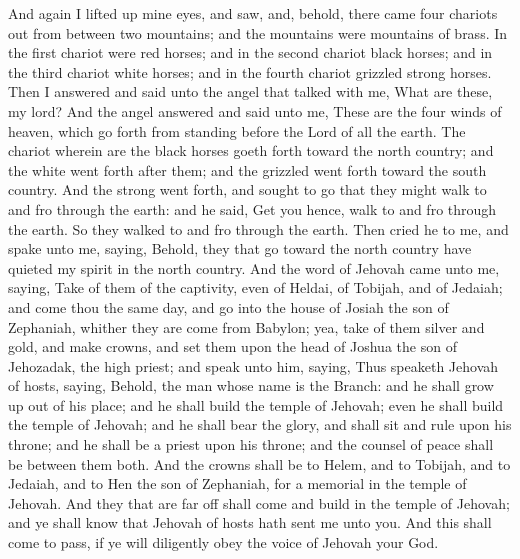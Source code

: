 And again I lifted up mine eyes, and saw, and, behold, there came four chariots out from between two mountains; and the mountains were mountains of brass. In the first chariot were red horses; and in the second chariot black horses; and in the third chariot white horses; and in the fourth chariot grizzled strong horses. Then I answered and said unto the angel that talked with me, What are these, my lord? And the angel answered and said unto me, These are the four winds of heaven, which go forth from standing before the Lord of all the earth. The chariot wherein are the black horses goeth forth toward the north country; and the white went forth after them; and the grizzled went forth toward the south country. And the strong went forth, and sought to go that they might walk to and fro through the earth: and he said, Get you hence, walk to and fro through the earth. So they walked to and fro through the earth. Then cried he to me, and spake unto me, saying, Behold, they that go toward the north country have quieted my spirit in the north country.  And the word of Jehovah came unto me, saying, Take of them of the captivity, even of Heldai, of Tobijah, and of Jedaiah; and come thou the same day, and go into the house of Josiah the son of Zephaniah, whither they are come from Babylon; yea, take of them silver and gold, and make crowns, and set them upon the head of Joshua the son of Jehozadak, the high priest; and speak unto him, saying, Thus speaketh Jehovah of hosts, saying, Behold, the man whose name is the Branch: and he shall grow up out of his place; and he shall build the temple of Jehovah; even he shall build the temple of Jehovah; and he shall bear the glory, and shall sit and rule upon his throne; and he shall be a priest upon his throne; and the counsel of peace shall be between them both. And the crowns shall be to Helem, and to Tobijah, and to Jedaiah, and to Hen the son of Zephaniah, for a memorial in the temple of Jehovah. And they that are far off shall come and build in the temple of Jehovah; and ye shall know that Jehovah of hosts hath sent me unto you. And this shall come to pass, if ye will diligently obey the voice of Jehovah your God. 

